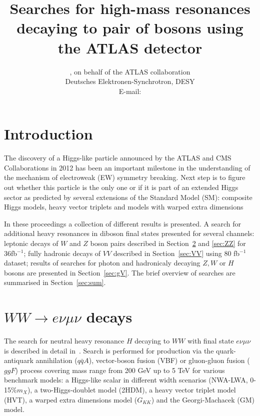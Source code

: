 \documentclass{PoS}
\title{Searches for high-mass resonances decaying to pair of bosons using the ATLAS detector}
\author{\speaker{Kirill Grevtsov}, {on behalf of the ATLAS collaboration}\\%
        Deutsches Elektronen-Synchrotron, DESY\\
        E-mail: \email{kirill.grevtsov@cern.ch}}
\begin{document}
\section{Introduction}

The discovery of a Higgs-like particle announced by the ATLAS and CMS Collaborations in 2012 \cite{HIGG-2012-27,CMS-HIG-12-028} has been an important milestone in the understanding of the mechanism of electroweak (EW) symmetry breaking. %
Next step is to figure out whether this particle is the only one or if it is part of an extended Higgs sector as predicted by several extensions of the Standard Model (SM): composite Higgs models, heavy vector triplets and models with warped extra dimensions


In these proceedings a collection of different results is presented.
A search for additional heavy resonances in diboson final states presented for several channels: leptonic decays of $W$ and $Z$ boson pairs described in Section~\ref{sec:WW} and \ref{sec:ZZ} for 36fb$^{-1}$; fully hadronic decays of $VV$ described in Section~\ref{sec:VV} using 80 fb$^{-1}$ dataset; results of searches for photon and hadronicaly decaying $Z,W$ or $H$ bosons are presented in Section~\ref{sec:gV}. The brief overview of searches are summarised in Section~\ref{sec:sum}.


\section{$WW\rightarrow e\nu \mu \nu$ decays}
\label{sec:WW}
The search for neutral heavy resonance $H$ decaying to $WW$ with final state $e\nu \mu \nu$ is described in detail in~\cite{HIGG-2016-31}. Search is performed for production via the quark-antiquark annihilation ($q\bar{q}A$), vector-boson fusion (VBF) or gluon-gluon fusion ($ggF$) process covering mass range from 200 GeV up to 5 TeV for various benchmark models: a Higgs-like scalar in different width scenarios (NWA-LWA, 0-15\%$m_X$), a two-Higgs-doublet model (2HDM), a heavy vector triplet model (HVT), a warped extra dimensions model ($G_{KK}$) and the Georgi-Machacek (GM) model.
\end{document}
